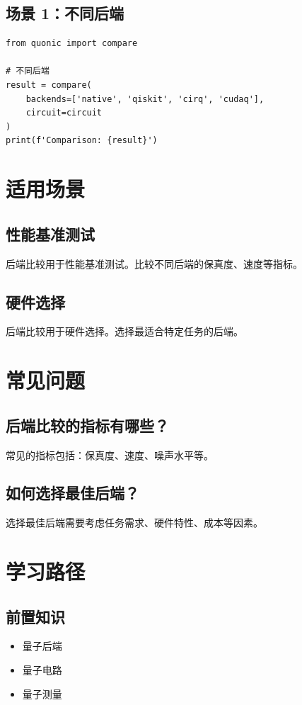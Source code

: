 \documentclass[12pt,a4paper]{article}
\begin{document}
\subsection{场景 1：不同后端}

\begin{verbatim}
from quonic import compare

# 不同后端
result = compare(
    backends=['native', 'qiskit', 'cirq', 'cudaq'],
    circuit=circuit
)
print(f'Comparison: {result}')
\end{verbatim}

\section{适用场景}

\subsection{性能基准测试}

后端比较用于性能基准测试。比较不同后端的保真度、速度等指标。

\subsection{硬件选择}

后端比较用于硬件选择。选择最适合特定任务的后端。

\section{常见问题}

\subsection{后端比较的指标有哪些？}

常见的指标包括：保真度、速度、噪声水平等。

\subsection{如何选择最佳后端？}

选择最佳后端需要考虑任务需求、硬件特性、成本等因素。

\section{学习路径}

\subsection{前置知识}
\begin{itemize}
  \item 量子后端
  \item 量子电路
  \item 量子测量
\end{itemize}
\end{document}
